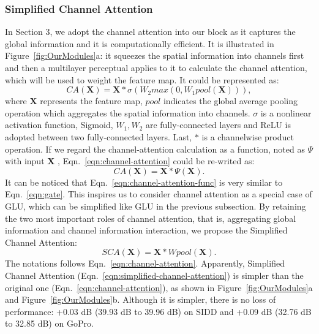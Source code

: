 \documentclass[runningheads]{llncs}
\begin{document}
\subsubsection{Simplified Channel Attention}
In Section 3, we adopt the channel attention\cite{hu2018squeeze} into our block as it captures the global information and it is computationally efficient. It is illustrated in Figure~\ref{fig:OurModules}a: it squeezes the spatial information into channels first and then a multilayer perceptual applies to it to calculate the channel attention, which will be used to weight the feature map. It could be represented as:
\begin{equation}\label{eqn:channel-attention}
CA(\mathbf{X}) = \mathbf{X} * \sigma(W_2 max(0, W_1 pool(\mathbf{X}))),
\end{equation} 
where $\mathbf{X}$ represents the feature map, $pool$ indicates the global average pooling operation which aggregates the spatial information into channels. $\sigma$ is a nonlinear activation function, Sigmoid, $W_1, W_2$ are fully-connected layers and ReLU is adopted between two fully-connected layers. Last, $*$ is a channelwise product operation. If we regard the channel-attention calculation as a function, noted as $\Psi$ with input $\mathbf{X}$ , Eqn.~\ref{eqn:channel-attention} could be re-writed as:
\begin{equation}\label{eqn:channel-attention-func}
CA(\mathbf{X}) = \mathbf{X} * \Psi(\mathbf{X}).
\end{equation}
It can be noticed that Eqn.~\ref{eqn:channel-attention-func} is very similar to Eqn.~\ref{eqn:gate}. 
This inspires us to consider channel attention as a special case of GLU, which can be simplified like GLU in the previous subsection.
By retaining the two most important roles of channel attention, that is, aggregating global information and channel information interaction, we propose the Simplified Channel Attention:
\begin{equation}\label{eqn:simplified-channel-attention}
SCA(\mathbf{X}) = \mathbf{X} * W pool(\mathbf{X}).
\end{equation}
The notations follows Eqn.~\ref{eqn:channel-attention}. Apparently, Simplified Channel Attention (Eqn.~\ref{eqn:simplified-channel-attention}) is simpler than the original one (Eqn.~\ref{eqn:channel-attention}), as shown in Figure~\ref{fig:OurModules}a and Figure~\ref{fig:OurModules}b.  
Although it is simpler, there is no loss of performance: +0.03 dB (39.93 dB to 39.96 dB) on SIDD and +0.09 dB  (32.76 dB to 32.85 dB) on GoPro. 
\end{document}
